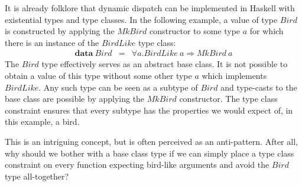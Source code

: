 \documentclass[authoryear,preprint]{sigplanconf}
\begin{document}
It is already folklore that dynamic dispatch can be implemented in Haskell with existential types and type classes. In the following example, a value of type $\mathit{Bird}$ is constructed by applying the $\mathit{MkBird}$ constructor to some type $a$ for which there is an instance of the $\mathit{BirdLike}$ type class:
\begin{displaymath}
\begin{array}{lcl}
\mathbf{data}~\mathit{Bird} & = & \forall a. \mathit{BirdLike}~a \Rightarrow \mathit{MkBird}~a
\end{array}
\end{displaymath}
The $\mathit{Bird}$ type effectively serves as an abstract base class. It is not possible to obtain a value of this type without some other type $a$ which implements $\mathit{BirdLike}$. Any such type can be seen as a subtype of $\mathit{Bird}$ and type-casts to the base class are possible by applying the $\mathit{MkBird}$ constructor. The type class constraint ensures that every subtype has the properties we would expect of, in this example, a bird.

This is an intriguing concept, but is often perceived as an anti-pattern. After all, why should we bother with a base class type if we can simply place a type class constraint on every function expecting bird-like arguments and avoid the $\mathit{Bird}$ type all-together?
\end{document}
